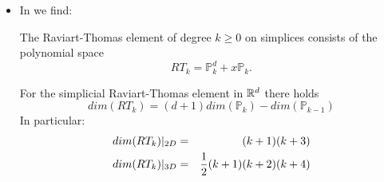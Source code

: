 \begin{itemize}
\begin{displayquote}
{A typical polynomial for $k=0$ would thus be 
\[
\left(
\begin{array}{c}
a_1+b_1 x \\
a_2+b_2 y
\end{array}
\right)
\]
and for $k=1$:
\[
\left(
\begin{array}{c}
a_1+b_1 x +c_1x^2 +d_1 y + e_1 xy  + f_2 x^2 y\\
a_2+b_2 y +c_2y^2 +d_2 x + e_2 xy  + f_2 x y^2
\end{array}
\right)
\]
Hence, $dim(RT_1)=12$, and in general, $dim(RT_k)=2(k+1)(k+2)$. 
This means you need two additional degrees of freedom, which should be located on the 
interior of the element. (In general, for $RT_k$ you take $k+1$ normal derivatives on each facet, 
and the remaining degrees of freedom from the interior.)

For Raviart-Thomas elements, you usually take moments rather than 
point evaluations, i.e., the remaining conditions come from the conditions 
\[
\int_{-1}^{+1} \int_{-1}^{+1} \phi_i(x,y)q_j(x,y)dx dy = \delta_{ij}
\]
where the ${q_j}$ are a basis of $P_{k-1,k}\times P_{k,k-1}$ (e.g. $1,x,y$ for $k=1$).
To make it easier to get a full nodal basis, the facet degrees of freedom are 
usually not taken as point evaluation, but also as moment conditions: 
\[
\int_{e_m} \phi_i(s)^T \nu_{e_m} q_{m,j}(s) ds
\]
where $e_m$ is one of the four edges, $\nu_{e_m}$ is the corresponding outer normal, 
and for each $m$, the $q_{m,j}$ form a basis of $P_k(e_m)$ (e.g. {1,x} or {1,y}
for $k=1$ depending on the edge orientation).
Together, these degrees of freedom are unisolvent (i.e., the corresponding system 
of basis functions is always invertible).
}
\end{displayquote}



\item
In \textcite{kanschat17}  we find:
\begin{displayquote}
{\color{darkgray}

The Raviart-Thomas element of degree $k\ge 0$ on
simplices consists of the polynomial space
\[
RT_k = {\mathbb P}_k^d + x {\mathbb P}_k.
\]

For the simplicial Raviart-Thomas element in ${\mathbb{R}}^d$
there holds
\[
dim(RT_k) = (d+1) dim({\mathbb P}_k) - dim({\mathbb P}_{k-1})
\]
In particular:
\begin{eqnarray}
dim(RT_k)|_{2D} &=& (k+1)(k+3) \nonumber\\
dim(RT_k)|_{3D} &=& \frac12(k+1)(k+2)(k+4)\nonumber
\end{eqnarray}


}
\end{displayquote}
\end{itemize}
